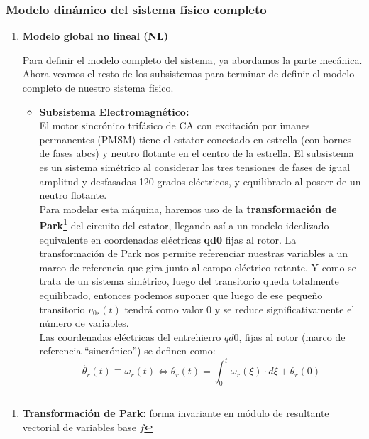 \documentclass[10pt]{article}
\begin{document}
\subsubsection{Modelo dinámico del sistema físico completo}

\begin{enumerate}
    \renewcommand{\theenumi}{\alph{enumi}} %
    \item \textbf{Modelo global no lineal (NL)}
    
    Para definir el modelo completo del sistema, ya abordamos la parte mecánica. Ahora veamos el resto de los subsistemas para terminar de definir el modelo completo de nuestro sistema físico.
	\begin{itemize}
		\item \textbf{Subsistema Electromagnético:}\vspace{0.3cm}\\
		El motor sincrónico trifásico de CA con excitación por imanes permanentes (PMSM) tiene el estator conectado en estrella (con bornes de fases abcs) y neutro flotante en el centro de la estrella.
		El subsistema es un sistema simétrico al considerar las tres tensiones de fases de igual amplitud y desfasadas 120 grados eléctricos, y equilibrado al poseer de un neutro flotante.
		\vspace{0.3cm}\\
		Para modelar esta máquina, haremos uso de la \textbf{transformación de Park}\footnote[1]{\textbf{Transformación de Park:} forma invariante en módulo de resultante vectorial de variables base $f$} del circuito del estator, llegando así a un modelo idealizado equivalente en coordenadas eléctricas \textbf{qd0} fijas al rotor.
		La transformación de Park nos permite referenciar nuestras variables a un marco de referencia que gira junto al campo eléctrico rotante.
		Y como se trata de un sistema simétrico, luego del transitorio queda totalmente equilibrado, entonces podemos suponer que luego de ese pequeño transitorio $v_{0s}(t)$ tendrá como valor $0$ y se reduce significativamente el número de variables.
		\vspace{0.3cm}\\
		Las coordenadas eléctricas del entrehierro $qd0$, fijas al rotor (marco de referencia “sincrónico”) se definen como:
		\begin{equation}
			\dot{\theta_{r}}\left ( t \right )\equiv \omega_{r}\left ( t \right )\Leftrightarrow \theta_{r}\left ( t \right )=\int_{0}^{t}\omega_{r}\left ( \xi \right )\cdot d\xi + \theta_{r}\left ( 0 \right )

\end{equation}
\end{itemize}
\end{enumerate}
\end{document}
